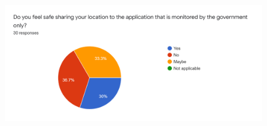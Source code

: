   \begin{figure}[H]
    \centering
    \includegraphics[width=\linewidth]{img/Survey/Q9.png}
  \end{figure}